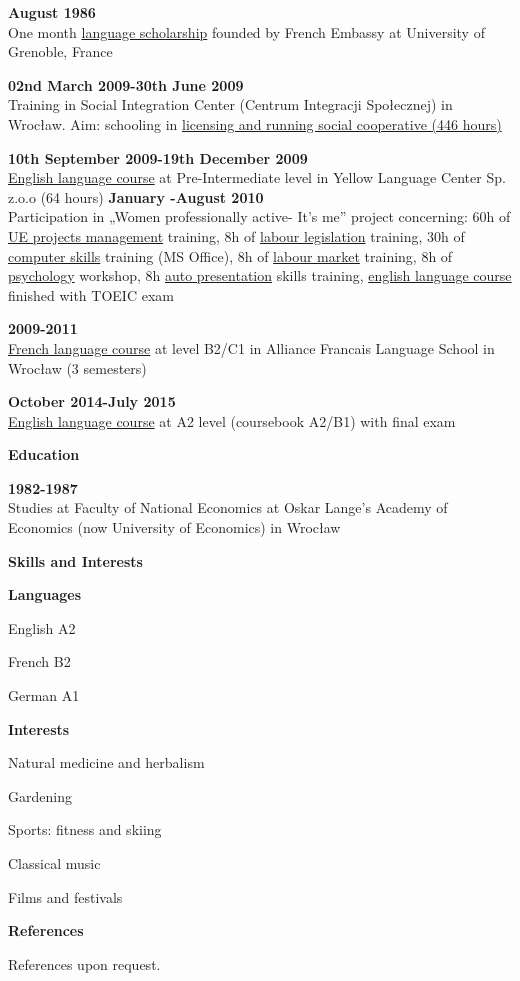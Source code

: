 \documentclass[a4paper,12pt,final]{memoir}
\newcommand{\Sep}{\vspace{1.5em}}
\newcommand{\SmallSep}{\vspace{0.5em}}
\newenvironment{Career Profile}
	{\ignorespaces\textbf{\color{ForestGreen} Career Profile}}
	{\Sep\ignorespacesafterend}
\newenvironment{Key experience}
	{\ignorespaces\textbf{\color{ForestGreen} Key experience}}
	{\Sep\ignorespacesafterend}
\newcommand{\CVSection}[1]
	{\Large\textbf{#1}\par
	\SmallSep\normalsize\normalfont}
\newcommand{\CVItem}[1]
	{\textbf{\color{ForestGreen} #1}}
\begin{document}
\CVItem{August 1986}\\
One month \underline{language scholarship} founded by French Embassy at University of Grenoble, France
\SmallSep

\CVItem{02nd March 2009-30th June 2009	}\\
Training in Social Integration Center (Centrum Integracji Społecznej) in 	Wrocław. Aim: schooling in \underline{licensing and running social cooperative (446 hours)}
\SmallSep

\CVItem{10th September 2009-19th December 2009}\\
\underline{English language course} at Pre-Intermediate level in Yellow Language Center 	Sp. z.o.o  (64 hours)
\SmallSep
\clearpage
\framebreak
\framebreak
\CVItem{January -August 2010 }\\
Participation in „Women professionally active- It's me” project concerning: 60h of \underline{UE projects management} training, 8h of \underline{labour legislation} training, 30h of \underline{computer skills} training (MS Office), 8h of \underline{labour market} training, 8h of \underline{psychology} workshop, 8h \underline{auto presentation} skills training,  \underline{english language course} finished with TOEIC exam
\SmallSep

\CVItem{2009-2011}\\
\underline{French language course} at level B2/C1 in Alliance Francais Language School in Wrocław (3 semesters)
\SmallSep

\CVItem{October 2014-July 2015}\\
\underline{English language course} at A2 level (coursebook A2/B1)
with final exam
\SmallSep

\CVSection{Education}
\CVItem{1982-1987}\\
Studies at Faculty of National Economics at Oskar Lange's Academy of Economics (now University of Economics) in Wrocław
\SmallSep


\CVSection{Skills and Interests}
\CVItem{Languages}
\begin{multicols}{3}
\begin{compactitem}[\color{ForestGreen}$\circ$]
	\item English A2
	\item French  B2
	\item German  A1
\end{compactitem}
\end{multicols}
\SmallSep

\CVItem{Interests}
\begin{multicols}{3}
\begin{compactitem}[\color{ForestGreen}$\circ$]
	\item Natural medicine and herbalism
	\item Gardening
	\item Sports: fitness and skiing 
	\item Classical music 
	\item Films and  festivals
\end{compactitem}
\end{multicols}
\Sep 

\CVSection{References}
References upon request.

\end{document}

